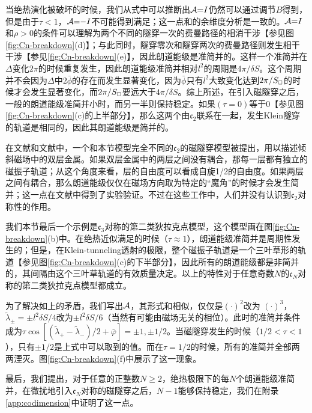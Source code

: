 当绝热演化被破坏的时候，我们从式中可以推断出${\cal A}{=}I$仍然可以通过调节$B$得到，但是由于$\tau{<}1$，${\cal A}{=}{-}I$不可能得到满足；这一点和的余维度分析是一致的。${\cal A}{=}I$和$\rho{>}0$的条件可以理解为两个不同的隧穿一次的费曼路径的相消干涉【参见图 \ref{fig:Cn-breakdown}(d)】；与此同时，隧穿零次和隧穿两次的费曼路径则发生相干干涉【参见\ref{fig:Cn-breakdown}(e)】，因此朗道能级是准简并的。这样一个准简并在$\Delta$变化$2\pi$的时候重复发生，因此朗道能级准简并相对$l^2$的周期是$4\pi/\delta S$。这个周期并不会因为$\Delta$中$2\bar{\phi}$的存在而发生显著变化，因为$\bar{\phi}$只有$l^2$大致变化达到$2\pi/S_{\scriptscriptstyle{\square}}$的时候才会发生显著变化，而$2\pi/S_{\scriptscriptstyle{\square}}$要远大于$4\pi/\delta S$。综上所述，在引入磁隧穿之后，一般的朗道能级准简并小时，而另一半则保持稳定。如果$(\tau{=}0)$等于0【参见图\ref{fig:Cn-breakdown}(c)的上半部分】，那么这两个由$\mathfrak{c}_2$联系在一起，发生Klein隧穿的轨道是相同的，因此其朗道能级是简并的。


在文献和文献中，一个和本节模型完全不同的$\mathfrak{c}_2$的磁隧穿模型被提出，用以描述倾斜磁场中的双层金属。如果双层金属中的两层之间没有耦合，那每一层都有独立的磁振子轨道；从这个角度来看，层的自由度可以看成自旋1/2的自由度。如果两层之间有耦合，那么朗道能级仅仅在磁场方向取为特定的“魔角”的时候才会发生简并；这一点在文献中得到了实验验证。不过在这些工作中，人们并没有认识到$\mathfrak{c}_2$对称性的作用。 


我们本节最后一个示例是$\mathfrak{c}_3$对称的第二类狄拉克点模型，这个模型画在图\ref{fig:Cn-breakdown}(b)中。在绝热近似满足的时候（$\tau{\approx}1$），朗道能级准简并是周期性发生的；但是，在Klein-tunneling透射的极限，整个磁振子轨道是一个三叶草形的轨道【参见图\ref{fig:Cn-breakdown}(c)的下半部分】，因此所有的朗道能级都是非简并的，其间隔由这个三叶草轨道的有效质量决定。以上的特性对于任意奇数$N$的$\mathfrak{c}_N$对称的第二类狄拉克点模型都成立。

为了解决如上的矛盾，我们写出${\cal A}$，其形式和相似，仅仅是$(\cdot)^2$改为
$(\cdot)^3$，$\tilde{\lambda}_\pm{=}{\pm} l^2\delta S/4$改为$\pm l^2\delta S/6$（当然有可能由磁场无关的相位）。此时的准简并条件成为$\tau\cos[(\tilde{\lambda}_+{-}\tilde{\lambda}_-)/2{+}\bar{\varphi}]{=}{\pm} 1,{\pm} 1/2$。当磁隧穿发生的时候（$1/2{<}\tau {<}1$），只有$\pm 1/2$是上式中可以取到的值。而在$\tau{=}1/2$的时候，所有的准简并全部两两湮灭。图\ref{fig:Cn-breakdown}(f)中展示了这一现象。


最后，我们提出，对于任意的正整数$N{\geq}2$，绝热极限下的每$N$个朗道能级准简并，在微扰地引入$\mathfrak{c}_N$对称的磁隧穿之后，$N{-}1$能够保持稳定，我们在附录\ref{app:codimension}中证明了这一点。


